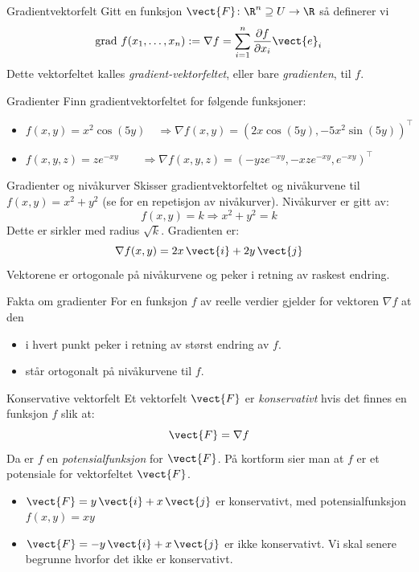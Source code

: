 \begin{defn}{Gradientvektorfelt}
Gitt en funksjon  $\vect{F}\colon \R^n \supseteq U \rightarrow \R$ så definerer vi
\[
\text{grad } f (x_1,\ldots, x_n) :=\nabla f= \sum_{i=1}^n \frac{\partial f}{\partial x_i}\vect{e}_i
\]
Dette vektorfeltet kalles \emph{gradient-vektorfeltet}, eller bare \textit{gradienten}, til $f$.
\end{defn}

\begin{eks}{Gradienter}
Finn gradientvektorfeltet for følgende funksjoner:
\begin{itemize}
  \item[a)] $f(x, y) = x^2\cos(5y) \quad  \Rightarrow \nabla f (x,y)= (2x\cos(5y), -5x^2\sin(5y) )^\top$
  \item[b)] $f(x, y, z) = ze^{-xy} \qquad  \Rightarrow \nabla f(x,y,z) = ( -yze^{-xy}, -xze^{-xy}, e^{-xy} )^\top$
\end{itemize}
\end{eks}
\begin{eks}{Gradienter og nivåkurver}
Skisser gradientvektorfeltet og nivåkurvene til $f(x, y) = x^2 + y^2$ (se  for en repetisjon av nivåkurver). Nivåkurver er gitt av:
\[
f(x, y) = k \Rightarrow x^2 + y^2 = k
\]
Dette er sirkler med radius $\sqrt{k}$.
Gradienten er:
\[
\nabla f(x, y) = 2x\,\vect{i} + 2y\,\vect{j}
\]
Vektorene er ortogonale på nivåkurvene og peker i retning av raskest endring.
\end{eks}
\begin{oppsum}{Fakta om gradienter}
For en funksjon $f$ av reelle verdier gjelder for vektoren $\nabla f$ at den
\begin{itemize}
\item i hvert punkt peker i retning av størst endring av $f$.
\item står ortogonalt på nivåkurvene til $f$.
\end{itemize}
\end{oppsum}
\begin{defn}{Konservative vektorfelt}
Et vektorfelt $\vect{F}$ er \emph{konservativt} hvis det finnes en funksjon $f$ slik at:
\[
\vect{F} = \nabla f
\]
Da er $f$ en \emph{potensialfunksjon} for $\vect{F}$. På kortform sier man at $f$ er et potensiale for vektorfeltet $\vect{F}$.
\end{defn}

\begin{eks}{}
\begin{itemize}
    \item $\vect{F} = y\, \vect{i} + x\, \vect{j}$ er konservativt, med potensialfunksjon $f(x, y) = xy$
    \item $\vect{F} = -y\, \vect{i} + x\, \vect{j}$ er ikke konservativt. Vi skal senere begrunne hvorfor det ikke er konservativt.
\end{itemize}
\end{eks}

